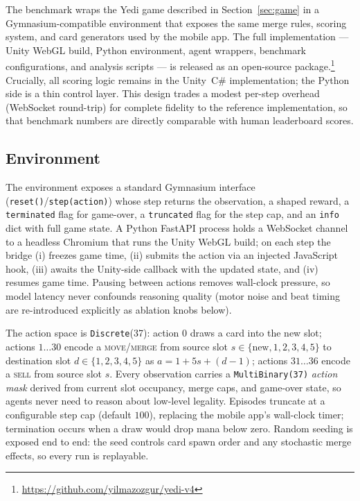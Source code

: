 \documentclass[11pt]{article}
\begin{document}
The benchmark wraps the Yedi game described in Section~\ref{sec:game} in a
Gymnasium-compatible environment that exposes the same merge rules, scoring
system, and card generators used by the mobile app. The full implementation
--- Unity WebGL build, Python environment, agent wrappers, benchmark
configurations, and analysis scripts --- is released as an open-source
package.\footnote{\url{https://github.com/yilmazozgur/yedi-v4}} Crucially, all scoring
logic remains in the Unity~C\# implementation; the Python side is a thin
control layer. This design trades a modest per-step overhead (WebSocket
round-trip) for complete fidelity to the reference implementation, so that
benchmark numbers are directly comparable with human leaderboard scores.

\subsection{Environment}
\label{sec:env}

The environment exposes a standard Gymnasium interface
(\texttt{reset()}/\texttt{step(action)}) whose step returns the observation,
a shaped reward, a \texttt{terminated} flag for game-over, a
\texttt{truncated} flag for the step cap, and an \texttt{info} dict with
full game state. A Python FastAPI process holds a WebSocket channel to a
headless Chromium that runs the Unity WebGL build; on each step the bridge
(i) freezes game time, (ii) submits the action via an injected JavaScript
hook, (iii) awaits the Unity-side callback with the updated state, and
(iv) resumes game time. Pausing between actions removes wall-clock
pressure, so model latency never confounds reasoning quality (motor noise
and beat timing are re-introduced explicitly as ablation knobs below).

The action space is \texttt{Discrete}(37): action $0$ draws a card into the
new slot; actions $1\ldots30$ encode a \textsc{move/merge} from source slot
$s \in \{\text{new}, 1, 2, 3, 4, 5\}$ to destination slot
$d \in \{1, 2, 3, 4, 5\}$ as $a = 1 + 5s + (d{-}1)$; actions $31\ldots36$
encode a \textsc{sell} from source slot $s$. Every observation carries a
\texttt{MultiBinary(37)} \emph{action mask} derived from current slot
occupancy, merge caps, and game-over state, so agents never need to reason
about low-level legality. Episodes truncate at a configurable step cap
(default $100$), replacing the mobile app's wall-clock timer; termination
occurs when a draw would drop mana below zero. Random seeding is exposed end
to end: the seed controls card spawn order and any stochastic merge effects,
so every run is replayable.
\end{document}
